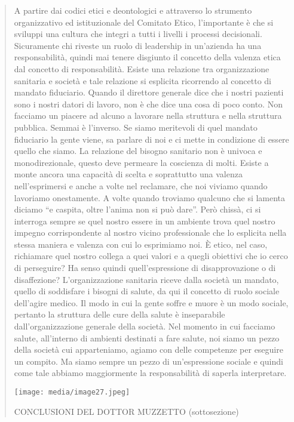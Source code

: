 \documentclass[]{article}
\begin{document}
\begin{quote}
A partire dai codici etici e deontologici e attraverso lo strumento
organizzativo ed istituzionale del Comitato Etico, l'importante è che si
sviluppi una cultura che integri a tutti i livelli i processi
decisionali. Sicuramente chi riveste un ruolo di leadership in
un'azienda ha una responsabilità, quindi mai tenere disgiunto il
concetto della valenza etica dal concetto di responsabilità. Esiste una
relazione tra organizzazione sanitaria e società e tale relazione si
esplicita ricorrendo al concetto di mandato fiduciario. Quando il
direttore generale dice che i nostri pazienti sono i nostri datori di
lavoro, non è che dice una cosa di poco conto. Non facciamo un piacere
ad alcuno a lavorare nella struttura e nella struttura pubblica. Semmai
è l'inverso. Se siamo meritevoli di quel mandato fiduciario la gente
viene, sa parlare di noi e ci mette in condizione di essere quello che
siamo. La relazione del bisogno sanitario non è univoca e
monodirezionale, questo deve permeare la coscienza di molti. Esiste a
monte ancora una capacità di scelta e soprattutto una valenza
nell'esprimersi e anche a volte nel reclamare, che noi viviamo quando
lavoriamo onestamente. A volte quando troviamo qualcuno che si lamenta
diciamo ``e caspita, oltre l'anima non si può dare''. Però chissà, ci si
interroga sempre se quel nostro essere in un ambiente trova quel nostro
impegno corrispondente al nostro vicino professionale che lo esplicita
nella stessa maniera e valenza con cui lo esprimiamo noi. È etico, nel
caso, richiamare quel nostro collega a quei valori e a quegli obiettivi
che io cerco di perseguire? Ha senso quindi quell'espressione di
disapprovazione o di disaffezione? L'organizzazione sanitaria riceve
dalla società un mandato, quello di soddisfare i bisogni di salute, da
qui il concetto di ruolo sociale dell'agire medico. Il modo in cui la
gente soffre e muore è un modo sociale, pertanto la struttura delle cure
della salute è inseparabile dall'organizzazione generale della società.
Nel momento in cui facciamo salute, all'interno di ambienti destinati a
fare salute, noi siamo un pezzo della società cui apparteniamo, agiamo
con delle competenze per eseguire un compito. Ma siamo sempre un pezzo
di un'espressione sociale e quindi come tale abbiamo maggiormente la
responsabilità di saperla interpretare.

\texttt{[image: media/image27.jpeg]}

CONCLUSIONI DEL DOTTOR MUZZETTO (sottosezione)


\end{quote}
\end{document}
